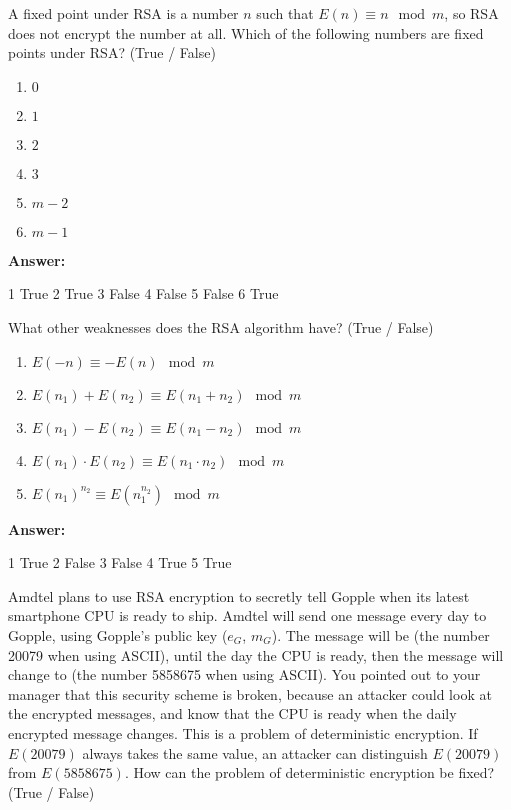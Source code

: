 \documentclass[12pt,twoside]{article}
\newcommand{\answer}{
 \par\medskip
 \textbf{Answer:}
}
\newcommand{\answerIId}{ \answer
1 True
2 True
3 False
4 False
5 False
6 True
}
\newcommand{\answerIIe}{ \answer
1 True
2 False
3 False
4 True
5 True
}
\begin{document}
\begin{problems}
\begin {problemparts}
\problempart {} A fixed point under RSA is a number $n$ such that $E(n)
\equiv n \mod m$, so RSA does not encrypt the number at all. Which of the
following numbers are fixed points under RSA? (True / False)
\begin{enumerate}
  \item $0$
  \item $1$
  \item $2$
  \item $3$
  \item $m - 2$
  \item $m - 1$
\end{enumerate}
\answerIId
  
\problempart {} What other weaknesses does the RSA algorithm have?
(True / False)
\begin{enumerate}
  \item $E(-n) \equiv -E(n) \mod m$
  \item $E(n_1) + E(n_2) \equiv E(n_1 + n_2) \mod m$
  \item $E(n_1) - E(n_2) \equiv E(n_1 - n_2) \mod m$
  \item $E(n_1) \cdot E(n_2) \equiv E(n_1 \cdot n_2) \mod m$
  \item $E(n_1)^{n_2} \equiv E(n_1 ^ {n_2}) \mod m$
\end{enumerate}
\answerIIe

\problempart {} Amdtel plans to use RSA encryption to secretly tell
Gopple when its latest smartphone CPU is ready to ship. Amdtel will send one
message every day to Gopple, using Gopple's public key ($e_G$, $m_G$). The
message will be  (the number 20079 when using ASCII), until the day
the CPU is ready, then the message will change to  (the number
5858675 when using ASCII). You pointed out to your manager that this security
scheme is broken, because an attacker could look at the encrypted messages, and
know that the CPU is ready when the daily encrypted message changes. This is a
problem of deterministic encryption. If $E(20079)$ always takes the same value,
an attacker can distinguish $E(20079)$ from $E(5858675)$. How can the problem of
deterministic encryption be fixed? (True / False)


\end{problemparts}
\end{problems}
\end{document}
